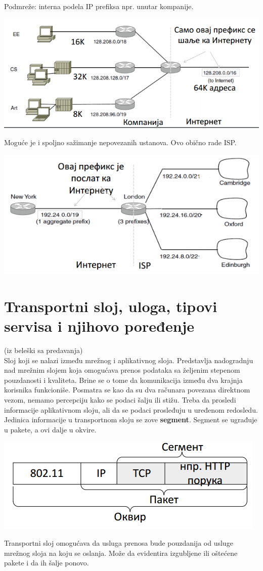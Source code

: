 \documentclass{article} %
\begin{document}
Podmreže: interna podela IP prefiksa npr. unutar kompanije.
\begin{center}
	\includegraphics[scale=0.4]{hijerRutiranje3}
\end{center}
Moguće je i spoljno sažimanje nepovezanih ustanova. Ovo obično rade ISP.
\begin{center}
	\includegraphics[scale=0.4]{hijerRutiranje4}
\end{center}
\section{Transportni sloj, uloga, tipovi servisa i njihovo poređenje}
(iz beleški sa predavanja)\\

Sloj koji se nalazi između mrežnog i aplikativnog sloja. Predstavlja nadogradnju nad mrežnim slojem koja omogućava prenos podataka sa željenim stepenom pouzdanosti i kvaliteta. Brine se o tome da komunikacija između dva krajnja korisnika funkcioniše. Posmatra se kao da su dva računara povezana direktnom vezom, nemamo percepciju kako se podaci šalju ili stižu. Treba da prosledi informacije aplikativnom sloju, ali da se podaci prosleđuju u uređenom redosledu. \\
Jedinica informacije u transportnom sloju se zove \textbf{segment}. Segment se ugrađuje u pakete, a ovi dalje u okvire.
\begin{center}
	\includegraphics[scale=0.4]{trans1}
\end{center}
Transportni sloj omogućava da usluga prenosa bude pouzdanija od usluge mrežnog sloja na koju se oslanja. Može da evidentira izgubljene ili oštećene pakete i da ih šalje ponovo.
\end{document}
